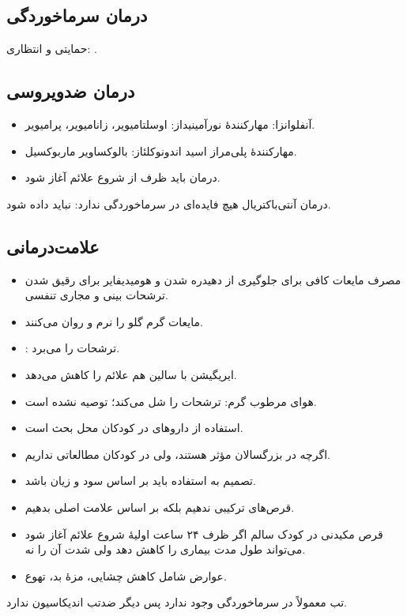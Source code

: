 \documentclass[12pt,a4paper]{article}
\begin{document}
\subsection*{درمان سرماخوردگی}
حمایتی و انتظاری: .
\subsection*{درمان ضدویروسی}
\begin{itemize}
\item آنفلوانزا: مهارکنندهٔ نورآمینیداز: اوسلتامیویر، زانامیویر، پرامیویر.
\item مهارکنندهٔ پلی‌مراز اسید اندونوکلئاز: بالوکساویر ماربوکسیل.
\item درمان باید ظرف  از شروع علائم آغاز شود.
\end{itemize}
درمان آنتی‌باکتریال هیچ فایده‌ای در سرماخوردگی ندارد: نباید داده شود.
\subsection*{علامت‌درمانی}
\begin{itemize}
\item مصرف مایعات کافی برای جلوگیری از دهیدره شدن و هومیدیفایر برای رقیق شدن ترشحات بینی و مجاری تنفسی.
\item مایعات گرم گلو را نرم و روان می‌کنند.
\end{itemize}

\begin{itemize}
\item {}: ترشحات را می‌برد.
\item ایریگیشن با سالین هم علائم را کاهش می‌دهد.
\item هوای مرطوب گرم: ترشحات را شل می‌کند؛ توصیه نشده است.
\item استفاده از داروهای  در کودکان محل بحث است.
\item اگرچه در بزرگسالان مؤثر هستند، ولی در کودکان مطالعاتی نداریم.
\item تصمیم به استفاده باید بر اساس سود و زیان باشد.
\item قرص‌های ترکیبی ندهیم بلکه بر اساس علامت اصلی بدهیم.
\item قرص مکیدنی  در کودک سالم اگر ظرف ۲۴ ساعت اولیهٔ شروع علائم آغاز شود می‌تواند طول مدت بیماری را کاهش دهد ولی شدت آن را نه.
\item عوارض شامل کاهش چشایی، مزهٔ بد، تهوع.
\end{itemize}
تب معمولاً در سرماخوردگی وجود ندارد پس دیگر ضدتب اندیکاسیون ندارد.
\end{document}
